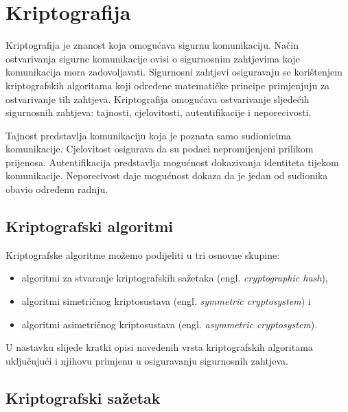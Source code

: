 \chapter{Kriptografija}
\label{ch:crypto}

Kriptografija je znanost koja omogućava sigurnu komunikaciju. Način ostvarivanja
sigurne komunikacije ovisi o sigurnosnim zahtjevima koje komunikacija mora
zadovoljavati. Sigurnosni zahtjevi osiguravaju se korištenjem kriptografskih
algoritama koji određene matematičke principe primjenjuju za ostvarivanje tih
zahtjeva. Kriptografija omogućava ostvarivanje sljedećih sigurnosnih zahtjeva:
tajnosti, cjelovitosti, autentifikacije i neporecivosti.

Tajnost predstavlja komunikaciju koja je poznata samo sudionicima komunikacije.
Cjelovitost osigurava da su podaci nepromijenjeni prilikom prijenosa.
Autentifikacija predstavlja mogućnost dokazivanja identiteta tijekom
komunikacije. Neporecivost daje mogućnost dokaza da je jedan od sudionika obavio
određenu radnju.

\section{Kriptografski algoritmi}

Kriptografske algoritme možemo podijeliti u tri osnovne skupine:
\begin{itemize}
\item algoritmi za stvaranje kriptografskih sažetaka (engl. \emph{cryptographic hash}),
\item algoritmi simetričnog kriptosustava (engl. \emph{symmetric cryptosystem}) i
\item algoritmi asimetričnog kriptosustava (engl. \emph{asymmetric
    cryptosystem}).
\end{itemize}

U nastavku slijede kratki opisi navedenih vrsta kriptografskih algoritama
uključujući i njihovu primjenu u osiguravanju sigurnosnih zahtjeva.

\section{Kriptografski sažetak}

